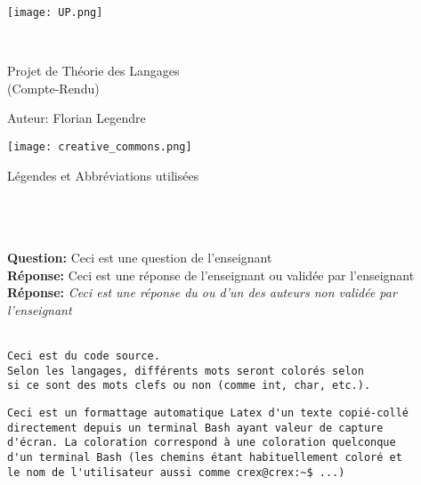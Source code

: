 \documentclass[a4paper, french]{report}
\begin{document}
\begin{titlepage}
    \begin{flushleft}
        \texttt{[image: UP.png]}\par
        \centering
        
        \vspace{13\baselineskip}       
        \HRule \\[0.4cm]

        {\Huge 
        Projet de Théorie des Langages\\ (Compte-Rendu)\par}
        \vspace{0.4cm}
        \HRule
        \vfill
      
        Auteur: Florian Legendre\medskip \par
        
        \texttt{[image: creative\_commons.png]}\par
    \end{flushleft}
\end{titlepage}

\newpage
\begin{LARGE}
Légendes et Abbréviations utilisées\\\\\\\\
\end{LARGE}
\textbf{Question:} Ceci est une question de l'enseignant\\
\textbf{Réponse:} Ceci est une réponse de l'enseignant ou validée par l'enseignant\\
\textbf{Réponse:} \textit{Ceci est une réponse du ou d'un des auteurs non validée par l'enseignant}\\\\

\begin{lstlisting}[style=C, caption=Exemple de code source]
Ceci est du code source.
Selon les langages, différents mots seront colorés selon 
si ce sont des mots clefs ou non (comme int, char, etc.).
\end{lstlisting}

\begin{mdframed}[style=Bash]
\begin{lstlisting}[style=Bash, caption=Exemple d'une pseudo capture d'écran Bash]
Ceci est un formattage automatique Latex d'un texte copié-collé
directement depuis un terminal Bash ayant valeur de capture
d'écran. La coloration correspond à une coloration quelconque 
d'un terminal Bash (les chemins étant habituellement coloré et 
le nom de l'utilisateur aussi comme crex@crex:~$ ...)
\end{lstlisting}
\end{mdframed}
\end{document}
